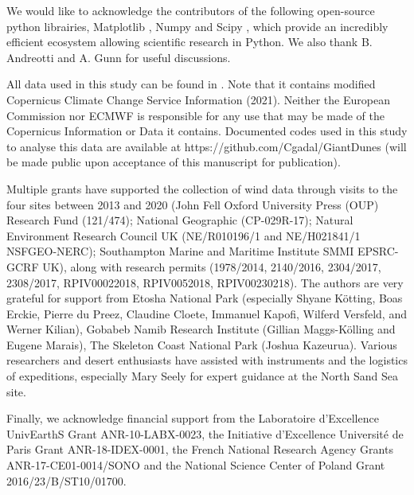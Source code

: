 \begin{acknowledgements}
We would like to acknowledge the contributors of the following open-source python librairies, Matplotlib \citep{Hunter2007}, Numpy \citep{Harris2020} and Scipy \citep{Virtanen2020}, which provide an incredibly efficient ecosystem allowing scientific research in Python. We also thank B. Andreotti and A. Gunn for useful discussions.

All data used in this study can be found in \citet{DataPaper}. Note that it contains modified Copernicus Climate Change Service Information (2021). Neither the European Commission nor ECMWF is responsible for any use that may be made of the Copernicus Information or Data it contains. Documented codes used in this study to analyse this data are available at https://github.com/Cgadal/GiantDunes (will be made public upon acceptance of this manuscript for publication).

Multiple grants have supported the collection of wind data through visits to the four sites between 2013 and 2020 (John Fell Oxford University Press (OUP) Research Fund (121/474); National Geographic (CP-029R-17); Natural Environment Research Council UK (NE/R010196/1 and NE/H021841/1 NSFGEO-NERC); Southampton Marine and Maritime Institute SMMI EPSRC-GCRF UK), along with research permits (1978/2014, 2140/2016, 2304/2017, 2308/2017, RPIV00022018, RPIV0052018, RPIV00230218).  The authors are very grateful for support from Etosha National Park (especially Shyane K\"otting, Boas Erckie, Pierre du Preez, Claudine Cloete, Immanuel Kapofi, Wilferd Versfeld, and Werner Kilian), Gobabeb Namib Research Institute (Gillian Maggs-K\"olling and Eugene Marais), The Skeleton Coast National Park (Joshua Kazeurua).  Various researchers and desert enthusiasts have assisted with instruments and the logistics of expeditions, especially Mary Seely for expert guidance at the North Sand Sea site.

Finally, we acknowledge financial support from the Laboratoire d'Excellence UnivEarthS Grant ANR-10-LABX-0023, the Initiative d'Excellence Universit\'e de Paris Grant ANR-18-IDEX-0001, the French National Research Agency Grants ANR-17-CE01-0014/SONO and the National Science Center of Poland Grant 2016/23/B/ST10/01700.

\end{acknowledgements}


